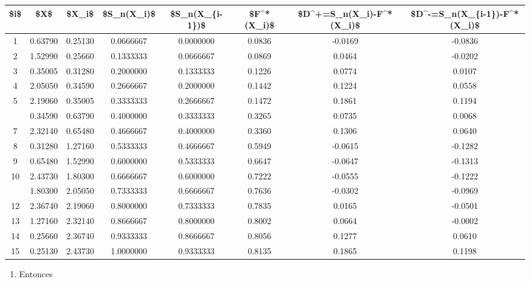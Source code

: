 \documentclass[
  a4paper,
  oneside,
  openany]{book}
\providecommand{\tightlist}{%
  \setlength{\itemsep}{0pt}\setlength{\parskip}{0pt}}
\begin{document}
\begin{table}[H]
\centering
\begin{tabular}{cccccccc}
\toprule
\$i\$ & \$X\$ & \$X\_i\$ & \$S\_n(X\_i)\$ & \$S\_n(X\_\{i-1\})\$ & \$F\textasciicircum{}*(X\_i)\$ & \$D\textasciicircum{}+=S\_n(X\_i)-F\textasciicircum{}*(X\_i)\$ & \$D\textasciicircum{}-=S\_n(X\_\{i-1\})-F\textasciicircum{}*(X\_i)\$\\
\midrule
1 & 0.63790 & 0.25130 & 0.0666667 & 0.0000000 & 0.0836 & -0.0169 & -0.0836\\
2 & 1.52990 & 0.25660 & 0.1333333 & 0.0666667 & 0.0869 & 0.0464 & -0.0202\\
3 & 0.35005 & 0.31280 & 0.2000000 & 0.1333333 & 0.1226 & 0.0774 & 0.0107\\
4 & 2.05050 & 0.34590 & 0.2666667 & 0.2000000 & 0.1442 & 0.1224 & 0.0558\\
5 & 2.19060 & 0.35005 & 0.3333333 & 0.2666667 & 0.1472 & 0.1861 & 0.1194\\
\addlinespace
6 & 0.34590 & 0.63790 & 0.4000000 & 0.3333333 & 0.3265 & 0.0735 & 0.0068\\
7 & 2.32140 & 0.65480 & 0.4666667 & 0.4000000 & 0.3360 & 0.1306 & 0.0640\\
8 & 0.31280 & 1.27160 & 0.5333333 & 0.4666667 & 0.5949 & -0.0615 & -0.1282\\
9 & 0.65480 & 1.52990 & 0.6000000 & 0.5333333 & 0.6647 & -0.0647 & -0.1313\\
10 & 2.43730 & 1.80300 & 0.6666667 & 0.6000000 & 0.7222 & -0.0555 & -0.1222\\
\addlinespace
11 & 1.80300 & 2.05050 & 0.7333333 & 0.6666667 & 0.7636 & -0.0302 & -0.0969\\
12 & 2.36740 & 2.19060 & 0.8000000 & 0.7333333 & 0.7835 & 0.0165 & -0.0501\\
13 & 1.27160 & 2.32140 & 0.8666667 & 0.8000000 & 0.8002 & 0.0664 & -0.0002\\
14 & 0.25660 & 2.36740 & 0.9333333 & 0.8666667 & 0.8056 & 0.1277 & 0.0610\\
15 & 0.25130 & 2.43730 & 1.0000000 & 0.9333333 & 0.8135 & 0.1865 & 0.1198\\
\bottomrule
\end{tabular}
\end{table}

\begin{enumerate}
\def\labelenumi{\arabic{enumi})}
\setcounter{enumi}{7}
\tightlist
\item
  Entonces
\end{enumerate}
\end{document}
